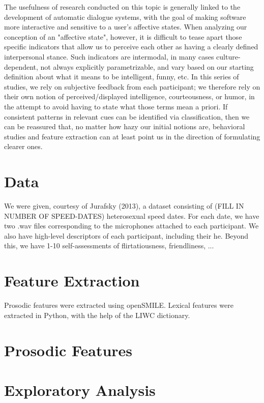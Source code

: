 \documentclass[11pt]{article}
\begin{document}
The usefulness of research conducted on this topic is generally linked to the development of automatic dialogue systems, with the goal of making software more interactive and sensitive to a user's affective states. When analyzing our conception of an "affective state", however, it is difficult to tease apart those specific indicators that allow us to perceive each other as having a clearly defined interpersonal stance. Such indicators are intermodal, in many cases culture-dependent, not always explicitly parametrizable, and vary based on our starting definition about what it means to be intelligent, funny, etc. In this series of studies, we rely on subjective feedback from each participant; we therefore rely on their own notion of perceived/displayed intelligence, courteousness, or humor, in the attempt to avoid having to state what those terms mean a priori. If consistent patterns in relevant cues can be identified via classification, then we can be reassured that, no matter how hazy our initial notions are, behavioral studies and feature extraction can at least point us in the direction of formulating clearer ones. 

\section{Data}
We were given, courtesy of Jurafsky (2013), a dataset consisting of (FILL IN NUMBER OF SPEED-DATES) heterosexual speed dates. For each date, we have two .wav files corresponding to the microphones attached to each participant.  We also have high-level descriptors of each participant, including their he.  Beyond this, we have 1-10 self-assessments of flirtatiousness, friendliness, ...

\section{Feature Extraction}
Prosodic features were extracted using openSMILE.  Lexical features were extracted in Python, with the help of the LIWC dictionary.  

\section{Prosodic Features}
 
\section{Exploratory Analysis}
\end{document}
